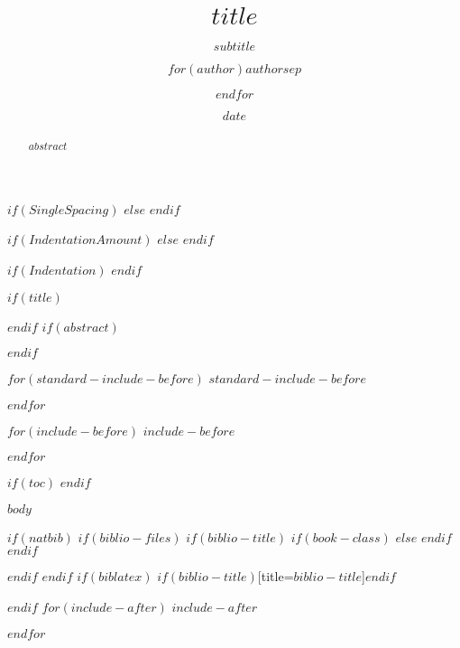 \documentclass[$if(fontsize)$$fontsize$$else$12pt$endif$,$if(lang)$$lang$,$endif$$if(papersize)$$papersize$$else$letterpaper$endif$$for(classoption)$,$classoption$$sep$$endfor$]{$if(documentclass)$$documentclass$$else$article$endif$}
\title{$title$}
\subtitle{$subtitle$}
\author{$for(author)$$author$$sep$ \and $endfor$}
\date{$date$}
\newcommand{\myfontsize}{$if(fontsize)$$fontsize$$else$12pt$endif$}
\newlength{\backup}
\begin{document}
\renewcommand*\familydefault{\sfdefault}
\normalfont
\ifthenelse{\lengthtest{\backup<0pt}}{\addtolength{\backup}{-2\baselineskip}\vspace*{\backup}\par}{}

$if(SingleSpacing)$
\setlength{\parskip}{\myfontsize}
$else$
\doublespacing
\setlength{\parindent}{0.5in}
\setlength{\RaggedRightParindent}{\parindent}
$endif$

\newlength{\myindentamount}
$if(IndentationAmount)$
\setlength{\myindentamount}{$IndentationAmount$}
$else$
\setlength{\myindentamount}{0.5in}
$endif$

$if(Indentation)$
\setlength{\parindent}{\myindentamount}
\setlength{\RaggedRightParindent}{\parindent}
$endif$

$if(title)$
\maketitle
$endif$
$if(abstract)$
\begin{abstract}
$abstract$
\end{abstract}
$endif$

$for(standard-include-before)$
$standard-include-before$

$endfor$

$for(include-before)$
$include-before$

$endfor$

$if(toc)$
{
\hypersetup{linkcolor=black}
\setcounter{tocdepth}{$toc-depth$}
\tableofcontents
}
$endif$
\thispagestyle{firststyle}

$body$

$if(natbib)$
$if(biblio-files)$
$if(biblio-title)$
$if(book-class)$
\renewcommand\bibname{$biblio-title$}
$else$
\renewcommand\refname{$biblio-title$}
$endif$
$endif$


$endif$
$endif$
$if(biblatex)$
\printbibliography$if(biblio-title)$[title=$biblio-title$]$endif$

$endif$
$for(include-after)$
$include-after$

$endfor$
\end{document}
